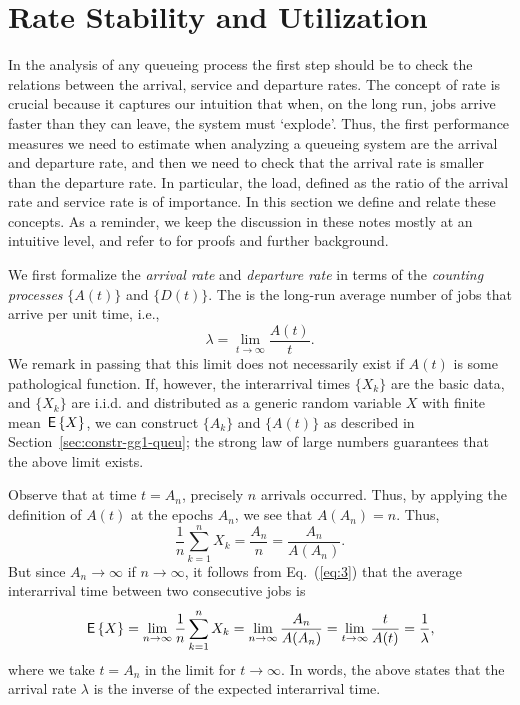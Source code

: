 \section{Rate Stability and Utilization}
\label{sec:rate-stability}

In the analysis of any queueing process the first step should be to
check the relations between the arrival, service and departure
rates. The concept of rate is crucial because it captures our
intuition that when, on the long run, jobs arrive faster than they can
leave, the system must `explode'. Thus, the first performance measures
we need to estimate when analyzing a queueing system are the arrival
and departure rate, and then we need to check that the arrival rate is
smaller than the departure rate. In particular, the load, defined as
the ratio of the arrival rate and service rate is of importance. In
this section we define and relate these concepts.  As a reminder, we
keep the discussion in these notes mostly at an intuitive level, and
refer to \cite{el-taha98:_sampl_path_analy_queuein_system} for proofs
and further background.


We first formalize the \emph{arrival rate} and \emph{departure rate}
in terms of the \emph{counting processes} $\{A(t)\}$ and $\{D(t)\}$.
The  is the long-run average number of jobs that
arrive per unit time, i.e.,
\begin{equation}
  \label{eq:3}
  \lambda = \lim_{t\to\infty} \frac{A(t)}t.
\end{equation}
We remark in passing that this limit does not necessarily exist if
$A(t)$ is some pathological function. If, however, the interarrival
times $\{X_k\}$ are the basic data, and $\{X_k\}$ are i.i.d.  and
distributed as a generic random variable $X$ with finite mean $\,\mathsf{E}\left\{X\right\}$,
we can construct $\{A_k\}$ and $\{A(t)\}$ as described in
Section~\ref{sec:constr-gg1-queu}; the strong law of large numbers
guarantees that the above limit exists.

Observe that at time $t=A_n$, precisely $n$ arrivals occurred. Thus,
by applying the definition of $A(t)$ at the epochs $A_n$, we see that
$A(A_n) = n$. Thus,
\begin{equation*}
  \frac{1}n\sum_{k=1}^n X_k = \frac{A_n}n = \frac{A_n}{A(A_n)}. 
\end{equation*}
But since $A_n\to\infty$ if $n\to\infty$, it follows from
Eq.~(\ref{eq:3}) that the average interarrival time between two
consecutive jobs is
\begin{equation}\label{eq:54}
  \,\mathsf{E}\left\{X\right\} = \lim_{n\to\infty}  \frac{1}n\sum_{k=1}^n X_k = \lim_{n\to \infty} \frac{A_n}{A(A_n)} = \lim_{t\to\infty} \frac t{A(t)} = \frac 1 \lambda,
\end{equation}
where we take $t=A_n$ in the limit for $t\to\infty$.  In words, the
above states that the arrival rate $\lambda$ is the inverse of the
expected interarrival time.


